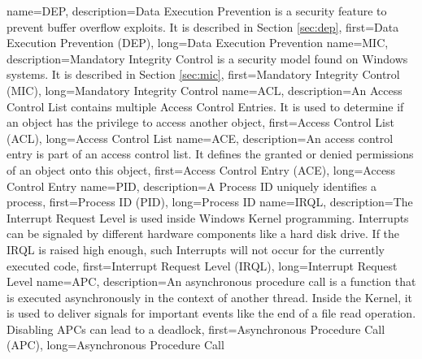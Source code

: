 {
  name={DEP},
  description={Data Execution Prevention is a security feature to prevent buffer overflow exploits. It is described in Section \ref{sec:dep}},
  first={Data Execution Prevention (DEP)},
  long={Data Execution Prevention}
}
{
  name={MIC},
  description={Mandatory Integrity Control is a security model found on Windows systems. It is described in Section \ref{sec:mic}},
  first={Mandatory Integrity Control (MIC)},
  long={Mandatory Integrity Control}
}
{
  name={ACL},
  description={An Access Control List contains multiple Access Control Entries. It is used to determine if an object has the privilege to access another object},
  first={Access Control List (ACL)},
  long={Access Control List}
}
{
  name={ACE},
  description={An access control entry is part of an access control list. It defines the granted or denied permissions of an object onto this object},
  first={Access Control Entry (ACE)},
  long={Access Control Entry}
}
{
  name={PID},
  description={A Process ID uniquely identifies a process},
  first={Process ID (PID)},
  long={Process ID}
}
{
  name={IRQL},
  description={The Interrupt Request Level is used inside Windows Kernel programming. Interrupts can be signaled by different hardware components like a hard disk drive. If the IRQL is raised high enough, such Interrupts will not occur for the currently executed code},
  first={Interrupt Request Level (IRQL)},
  long={Interrupt Request Level}
}
{
  name={APC},
  description={An asynchronous procedure call is a function that is executed asynchronously in the context of another thread. Inside the Kernel, it is used to deliver signals for important events like the end of a file read operation. Disabling APCs can lead to a deadlock},
  first={Asynchronous Procedure Call (APC)},
  long={Asynchronous Procedure Call}
}